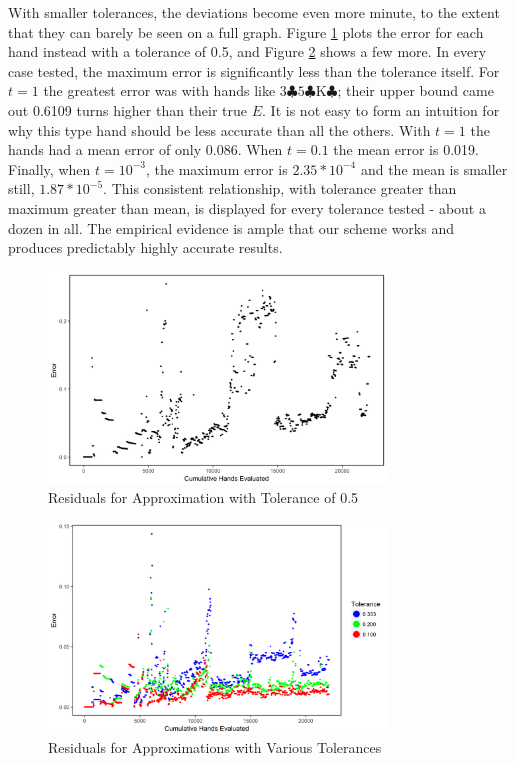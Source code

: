 \documentclass[letter,12pt]{article}
\begin{document}
With smaller tolerances, the deviations become even more minute, to the extent that they can barely be seen on a full graph. Figure \ref{fig:5} plots the error for each hand instead with a tolerance of 0.5, and Figure \ref{fig:6} shows a few more. In every case tested, the maximum error is significantly less than the tolerance itself. For $t=1$ the greatest error was with hands like $3\clubsuit 5\clubsuit \textrm{K}\clubsuit$; their upper bound came out 0.6109 turns higher than their true $E$. It is not easy to form an intuition for why this type hand should be less accurate than all the others. With $t=1$ the hands had a mean error of only 0.086. When $t=0.1$ the mean error is 0.019. Finally, when $t=10^{-3}$, the maximum error is $2.35*10^{-4}$ and the mean is smaller still, $1.87 * 10^{-5}$. This consistent relationship, with tolerance greater than maximum greater than mean, is displayed for every tolerance tested - about a dozen in all. The empirical evidence is ample that our scheme works and produces predictably highly accurate results.

\begin{figure}
\centering
\includegraphics[width=0.8\textwidth]{fig5.png}
\caption{Residuals for Approximation with Tolerance of 0.5}\label{fig:5}
\end{figure}

\begin{figure}
\centering
\includegraphics[width=0.8\textwidth]{fig6.png}
\caption{Residuals for Approximations with Various Tolerances}\label{fig:6}
\end{figure}
\end{document}
